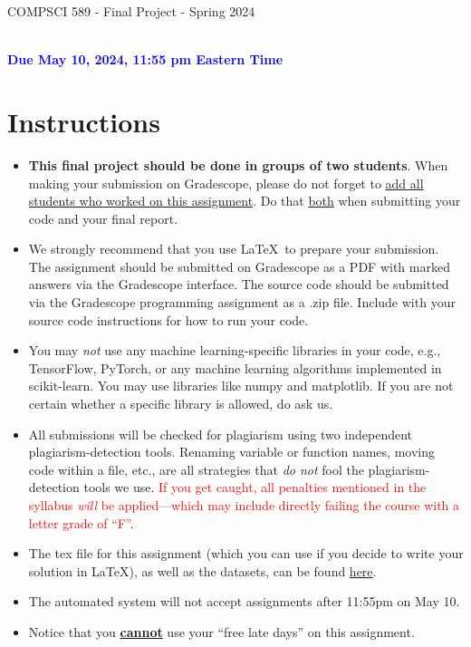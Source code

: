 \documentclass[letterpaper]{article}
\newcommand{\HIGHLIGHT}[1]{\textcolor{blue}{\textbf{#1}}}
\begin{document}
\newpage
\begin{center}
	\begin{Large}
		COMPSCI 589 - Final Project - Spring 2024
	\end{Large}
	\\
	\HIGHLIGHT{Due May 10, 2024, 11:55 pm Eastern Time}
\end{center}



\vspace{0.25in}
\section{Instructions}

\begin{itemize}
	\item \textbf{This final project should be done in groups of two students}. When making your submission on Gradescope, please do not forget to \href{https://help.gradescope.com/article/m5qz2xsnjy-student-add-group-members}{add all students who worked on this assignment}. Do that \underline{both} when submitting your code and your final report.
	\item We strongly recommend that you use \LaTeX~to prepare your submission. The assignment should be submitted on Gradescope as a PDF with marked answers via the Gradescope interface. The source code should be submitted via the Gradescope programming assignment as a .zip file. Include with your source code instructions for how to run your code.
	\item You may \textit{not} use any machine learning-specific libraries in your code, e.g., TensorFlow, PyTorch, or any machine learning algorithms implemented in scikit-learn. You may use libraries like numpy and matplotlib. If you are not certain whether a specific library is allowed, do ask us.
	\item All submissions will be checked for plagiarism using two independent plagiarism-detection tools. Renaming variable or function names, moving code within a file, etc., are all strategies that \textit{do not} fool the plagiarism-detection tools we use. \textcolor{red}{If you get caught, all penalties mentioned in the syllabus \textit{will} be applied---which may include directly failing the course with a letter grade of ``F''}.
	\item The tex file for this assignment (which you can use if you decide to write your solution in \LaTeX), as well as the datasets, can be found \href{https://people.cs.umass.edu/~bsilva/courses/CMPSCI_589/Spring2024/homeworks/final_project.zip}{here}.
	\item The automated system will not accept assignments after 11:55pm on May 10.
	\item Notice that you \underline{\textbf{cannot}} use your ``free late days'' on this assignment.
\end{itemize}
\end{document}
